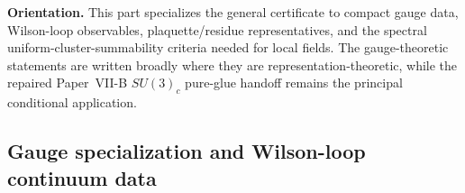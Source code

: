 \documentclass[12pt,a4paper]{article}
\begin{document}

\noindent\textbf{Orientation.}
This part specializes the general certificate to compact gauge data, Wilson-loop observables, plaquette/residue representatives, and the spectral uniform-cluster-summability criteria needed for local fields.  The gauge-theoretic statements are written broadly where they are representation-theoretic, while the repaired Paper~VII-B \(SU(3)_c\) pure-glue handoff remains the principal conditional application.


\subsection{Gauge specialization and Wilson-loop continuum data}
\label{p12:sec:gauge-specialization}
\end{document}
